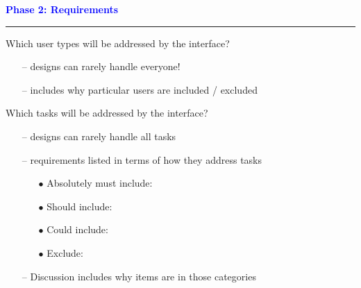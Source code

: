 \documentclass[pdf]{beamer}
\begin{document}
{
\begin{frame}
	\vspace{8mm}
	\textcolor{Blue}{\textbf{\Large{Phase 2: Requirements}}}
    \textcolor{red}{\rule{10cm}{1mm}}


    \bigskip
     Which user types will be addressed by the interface?
        \begin{itemize}
        \item[{--}] designs can rarely handle everyone!
        \item[{--}] includes why particular users are included / excluded
        \end{itemize}

    \bigskip
     Which tasks will be addressed by the interface?
        \begin{itemize}
        \item[{--}] designs can rarely handle all tasks
        \item[{--}] requirements listed in terms of how they address tasks
            \begin{itemize}
                \item[{$\bullet$}] Absolutely must include:
                \item[{$\bullet$}] Should include:
                \item[{$\bullet$}] Could include:
                \item[{$\bullet$}] Exclude:
            \end{itemize}

    \bigskip

        \item[{--}] Discussion includes why items are in those categories
        \end{itemize}

\end{frame}}
\end{document}
